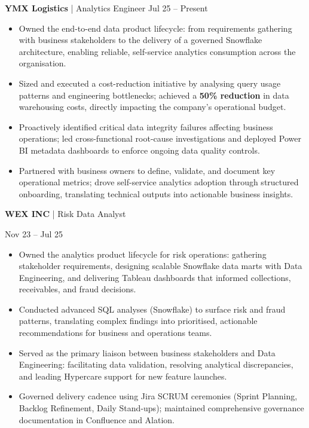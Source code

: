 \documentclass[9pt, letterpaper]{article}
\begin{document}
	\noindent \textbf{YMX Logistics} | Analytics Engineer \hfill Jul 25 -- Present
	\begin{itemize}[noitemsep, topsep=1pt, leftmargin=1.5em, rightmargin=0.5cm]
		\item Owned the end-to-end data product lifecycle: from requirements gathering with business stakeholders to the delivery of a governed Snowflake architecture, enabling reliable, self-service analytics consumption across the organisation.
		\item Sized and executed a cost-reduction initiative by analysing query usage patterns and engineering bottlenecks; achieved a \textbf{50\% reduction} in data warehousing costs, directly impacting the company's operational budget.
		\item Proactively identified critical data integrity failures affecting business operations; led cross-functional root-cause investigations and deployed Power BI metadata dashboards to enforce ongoing data quality controls.
		\item Partnered with business owners to define, validate, and document key operational metrics; drove self-service analytics adoption through structured onboarding, translating technical outputs into actionable business insights.
	\end{itemize}

	\noindent \begin{minipage}[t]{0.75\textwidth}
		\textbf{WEX INC} | Risk Data Analyst
	\end{minipage}
	\begin{minipage}[t]{0.25\textwidth}
		\raggedleft Nov 23 -- Jul 25
	\end{minipage}

	\begin{itemize}[noitemsep, topsep=1pt, leftmargin=1.5em, rightmargin=0.5cm]
		\item Owned the analytics product lifecycle for risk operations: gathering stakeholder requirements, designing scalable Snowflake data marts with Data Engineering, and delivering Tableau dashboards that informed collections, receivables, and fraud decisions.
		\item Conducted advanced SQL analyses (Snowflake) to surface risk and fraud patterns, translating complex findings into prioritised, actionable recommendations for business and operations teams.
		\item Served as the primary liaison between business stakeholders and Data Engineering: facilitating data validation, resolving analytical discrepancies, and leading Hypercare support for new feature launches.
		\item Governed delivery cadence using Jira SCRUM ceremonies (Sprint Planning, Backlog Refinement, Daily Stand-ups); maintained comprehensive governance documentation in Confluence and Alation.
	\end{itemize}
\end{document}
